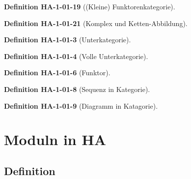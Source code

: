 \documentclass[10pt, letterpaper]{article}
\newcommand{\CustomHeading}[3]{%
  \par\medskip\noindent%
  \textbf{#1 #2} \textnormal{(#3)}.\enskip%
}
\newenvironment{DEF}[2]{\CustomHeading{Definition}{#1}{#2}}{}
\begin{document}
\begin{DEF}{HA-1-01-19}{(Kleine) Funktorenkategorie}

\end{DEF}

\begin{DEF}{HA-1-01-21}{Komplex und Ketten-Abbildung}

\end{DEF}

\begin{DEF}{HA-1-01-3}{Unterkategorie}

\end{DEF}

\begin{DEF}{HA-1-01-4}{Volle Unterkategorie}

\end{DEF}

\begin{DEF}{HA-1-01-6}{Funktor}

\end{DEF}

\begin{DEF}{HA-1-01-8}{Sequenz in Kategorie}

\end{DEF}

\begin{DEF}{HA-1-01-9}{Diagramm in Katagorie}

\end{DEF}






































\section{Moduln in HA}

\subsection{Definition}
\end{document}
